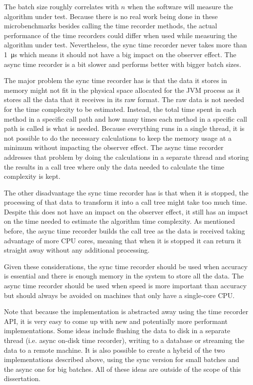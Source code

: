 \noindent The batch size roughly correlates with $n$ when the software will measure the algorithm under test. Because there is no real work being done in these microbenchmarks besides calling the time recorder methods, the actual performance of the time recorders could differ when used while measuring the algorithm under test. Nevertheless, the sync time recorder never takes more than 
\SI{1}{\micro\second} which means it should not have a big impact on the observer effect. The async time recorder is a bit slower and performs better with bigger batch sizes.

\noindent The major problem the sync time recorder has is that the data it stores in memory might not fit in the physical space allocated for the JVM process as it stores all the data that it receives in its raw format. The raw data is not needed for the time complexity to be estimated. Instead, the total time spent in each method in a specific call path and how many times each method in a specific call path is called is what is needed. Because everything runs in a single thread, it is not possible to do the necessary calculations to keep the memory usage at a minimum without impacting the observer effect. The async time recorder addresses that problem by doing the calculations in a separate thread and storing the results in a call tree where only the data needed to calculate the time complexity is kept.

\noindent The other disadvantage the sync time recorder has is that when it is stopped, the processing of that data to transform it into a call tree might take too much time. Despite this does not have an impact on the observer effect, it still has an impact on the time needed to estimate the algorithm time complexity. As mentioned before, the async time recorder builds the call tree as the data is received taking advantage of more CPU cores, meaning that when it is stopped it can return it straight away without any additional processing.

\noindent Given these considerations, the sync time recorder should be used when accuracy is essential and there is enough memory in the system to store all the data. The async time recorder should be used when speed is more important than accuracy but should always be avoided on machines that only have a single-core CPU.

\noindent Note that because the implementation is abstracted away using the time recorder API, it is very easy to come up with new and potentially more performant implementations. Some ideas include flushing the data to disk in a separate thread (i.e. async on-disk time recorder), writing to a database or streaming the data to a remote machine. It is also possible to create a hybrid of the two implementations described above, using the sync version for small batches and the async one for big batches. All of these ideas are outside of the scope of this dissertation.

